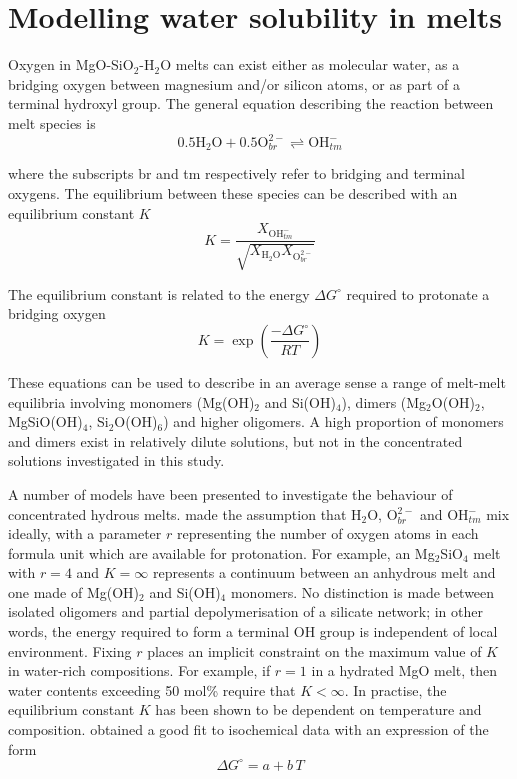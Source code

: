 \documentclass[review]{elsarticle}
\begin{document}
\section{Modelling water solubility in melts}

Oxygen in MgO-SiO$_2$-H$_2$O melts can exist either as molecular water, as a bridging oxygen between magnesium and/or silicon atoms, or as part of a terminal hydroxyl group. The general equation describing the reaction between melt species is
\begin{equation}
0.5 \textrm{H}_2\textrm{O} + 0.5 \textrm{O}_{br}^{2-} \rightleftharpoons \textrm{OH}_{tm}^-
\label{eqn:speciation}
\end{equation}

where the subscripts br and tm respectively refer to bridging and terminal oxygens. The equilibrium between these species can be described with an equilibrium constant $K$ \cite[e.g.][]{Stolper1982}
\begin{equation}
K = \frac{X_{\textrm{OH}_{tm}^-}}{\sqrt{X_{\textrm{H}_2\textrm{O}} X_{\textrm{O}_{br}^{2-}} } }
\label{eqn:equilibrium_constant}
\end{equation}

The equilibrium constant is related to the energy $\Delta G^{\circ}$ required to protonate a bridging oxygen
\begin{equation}
K = \exp\left(\frac{-\Delta G^{\circ}}{RT}\right)
\end{equation}

These equations can be used to describe in an average sense a range of melt-melt equilibria involving monomers (Mg(OH)$_2$ and Si(OH)$_4$), dimers (Mg$_2$O(OH)$_2$, MgSiO(OH)$_4$, Si$_2$O(OH)$_6$) and higher oligomers. A high proportion of monomers and dimers exist in relatively dilute solutions, but not in the concentrated solutions investigated in this study.

A number of models have been presented to investigate the behaviour of concentrated hydrous melts. \cite{SS1985} made the assumption that H$_2$O, O$_{br}^{2-}$ and OH$_{tm}^-$ mix ideally, with a parameter $r$ representing the number of oxygen atoms in each formula unit which are available for protonation. For example, an Mg$_2$SiO$_4$ melt with $r=4$ and $K=\infty$ represents a continuum between an anhydrous melt and one made of Mg(OH)$_2$ and Si(OH)$_4$ monomers. No distinction is made between isolated oligomers and partial depolymerisation of a silicate network; in other words, the energy required to form a terminal OH group is independent of local environment. Fixing $r$ places an implicit constraint on the maximum value of $K$ in water-rich compositions. For example, if $r=1$ in a hydrated MgO melt, then water contents exceeding 50 mol\% require that $K<\infty$. In practise, the equilibrium constant $K$ has been shown to be dependent on temperature and composition. \cite{SK1995} obtained a good fit to isochemical data with an expression of the form
\begin{equation}
\Delta G^{\circ} = a + b\,T
\end{equation}
\end{document}
